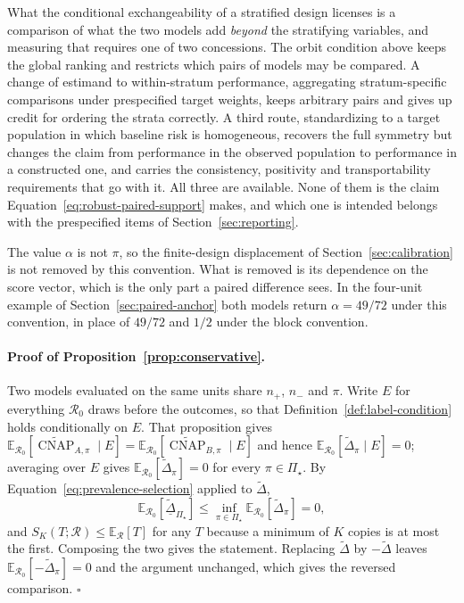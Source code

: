 \documentclass[11pt]{article}
\newcommand{\CNAP}{\operatorname{CNAP}}
\newcommand{\Regime}{\mathcal{R}}
\newcommand{\PSet}{\Pi_\star}
\newcommand{\E}{\mathbb{E}}
\newcommand{\CNAPta}{\widetilde{\CNAP}}
\newcommand{\Dta}{\widetilde{\Delta}}
\newcommand{\RobDta}{\underline{\widetilde{\Delta}}_{\PSet}}
\theoremstyle{remark}
\begin{document}
What the conditional exchangeability of a stratified design licenses is a comparison of what the two models add \emph{beyond} the stratifying variables, and measuring that requires one of two concessions. The orbit condition above keeps the global ranking and restricts which pairs of models may be compared. A change of estimand to within-stratum performance, aggregating stratum-specific comparisons under prespecified target weights, keeps arbitrary pairs and gives up credit for ordering the strata correctly. A third route, standardizing to a target population in which baseline risk is homogeneous, recovers the full symmetry but changes the claim from performance in the observed population to performance in a constructed one, and carries the consistency, positivity and transportability requirements that go with it. All three are available. None of them is the claim Equation~\eqref{eq:robust-paired-support} makes, and which one is intended belongs with the prespecified items of Section~\ref{sec:reporting}.


The value $\alpha$ is not $\pi$, so the finite-design displacement of Section~\ref{sec:calibration} is not removed by this convention. What is removed is its dependence on the score vector, which is the only part a paired difference sees. In the four-unit example of Section~\ref{sec:paired-anchor} both models return $\alpha=49/72$ under this convention, in place of $49/72$ and $1/2$ under the block convention.

\paragraph{Proof of Proposition~\ref{prop:conservative}.}
Two models evaluated on the same units share $n_+$, $n_-$ and $\pi$. Write $E$ for everything $\Regime_0$ draws before the outcomes, so that Definition~\ref{def:label-condition} holds conditionally on $E$. That proposition gives $\E_{\Regime_0}[\CNAPta_{A,\pi}\mid E]=\E_{\Regime_0}[\CNAPta_{B,\pi}\mid E]$ and hence $\E_{\Regime_0}[\Dta_\pi\mid E]=0$; averaging over $E$ gives $\E_{\Regime_0}[\Dta_\pi]=0$ for every $\pi\in\PSet$. By Equation~\eqref{eq:prevalence-selection} applied to $\Dta$,
\[
\E_{\Regime_0}[\RobDta]
\leq
\inf_{\pi\in\PSet}\E_{\Regime_0}[\Dta_\pi]
=0 ,
\]
and $S_K(T;\Regime)\leq\E_{\Regime}[T]$ for any $T$ because a minimum of $K$ copies is at most the first. Composing the two gives the statement. Replacing $\Dta$ by $-\Dta$ leaves $\E_{\Regime_0}[-\Dta_\pi]=0$ and the argument unchanged, which gives the reversed comparison. $\square$
\end{document}
